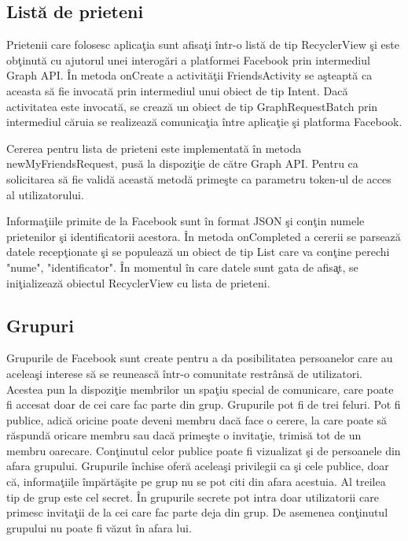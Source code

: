 \subsection{List\u{a} de prieteni}

Prietenii care folosesc aplica\c{t}ia sunt afisa\c{t}i \^{i}ntr-o list\u{a} de tip RecyclerView \c{s}i este ob\c{t}inut\u{a} cu ajutorul unei interog\u{a}ri a platformei Facebook prin intermediul Graph API. \^{I}n metoda onCreate a activit\u{a}\c{t}ii FriendsActivity se a\c{s}teapt\u{a} ca aceasta s\u{a} fie invocat\u{a} prin intermediul unui obiect de tip Intent. Dac\u{a} activitatea este invocat\u{a}, se creaz\u{a} un obiect de tip GraphRequestBatch prin intermediul c\u{a}ruia se realizeaz\u{a} comunica\c{t}ia \^{i}ntre aplica\c{t}ie \c{s}i platforma Facebook. 

Cererea pentru lista de prieteni este implementat\u{a} \^{i}n metoda newMyFriendsRequest, pus\u{a} la dispozi\c{t}ie de c\u{a}tre Graph API. Pentru ca solicitarea s\u{a} fie valid\u{a} aceast\u{a} metod\u{a} prime\c{s}te ca parametru token-ul de acces al utilizatorului.

Informa\c{t}iile primite de la Facebook sunt \^{i}n format JSON \c{s}i con\c{t}in numele prietenilor \c{s}i identificatorii acestora. \^{I}n metoda onCompleted a cererii se parseaz\u{a} datele recep\c{t}ionate \c{s}i se populeaz\u{a} un obiect de tip List care va con\c{t}ine perechi "nume", "identificator". \^{I}n momentul \^{i}n care datele sunt gata de afis\c{a}t, se ini\c{t}ializeaz\u{a} obiectul RecyclerView cu lista de prieteni. 

\subsection{Grupuri}

Grupurile de Facebook sunt create pentru a da posibilitatea persoanelor care au acelea\c{s}i interese s\u{a} se reuneasc\u{a} \^{i}ntr-o comunitate restr\^{a}ns\u{a} de utilizatori. Acestea pun la dispozi\c{t}ie membrilor un spa\c{t}iu special de comunicare, care poate fi accesat doar de cei care fac parte din grup. Grupurile pot fi de trei feluri. Pot fi publice, adic\u{a} oricine poate deveni membru dac\u{a} face o cerere, la care poate s\u{a} r\u{a}spund\u{a} oricare membru sau dac\u{a} prime\c{s}te o invita\c{t}ie, trimis\u{a} tot de un membru oarecare. Con\c{t}inutul celor publice poate fi vizualizat \c{s}i de persoanele din afara grupului. Grupurile \^{i}nchise ofer\u{a} acelea\c{s}i privilegii ca \c{s}i cele publice, doar c\u{a}, informa\c{t}iile \^{i}mp\u{a}rt\u{a}\c{s}ite pe grup nu se pot citi din afara acestuia. Al treilea tip de grup este cel secret. \^{I}n grupurile secrete pot intra doar utilizatorii care primesc invita\c{t}ii de la cei care fac parte deja din grup. De asemenea con\c{t}inutul grupului nu poate fi v\u{a}zut \^{i}n afara lui. 

